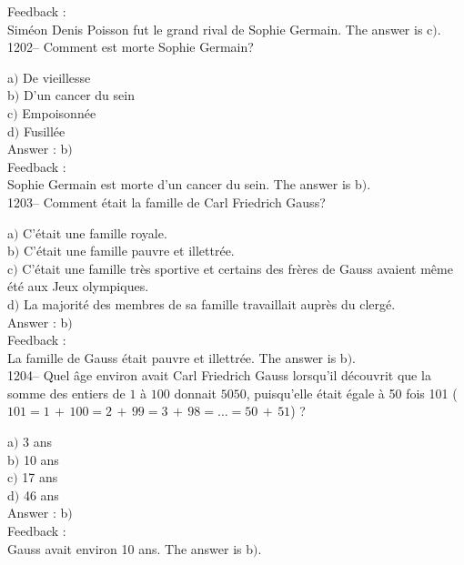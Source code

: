 ﻿\documentclass[letterpaper, 12pt]{article}
\begin{document}
Feedback : \\
Sim\'eon Denis Poisson fut le grand rival de Sophie Germain.
The answer is c$)$.\\

1202-- Comment est morte Sophie Germain?

a$)$ De vieillesse \\
b$)$ D'un cancer du sein \\
c$)$ Empoisonn\'ee \\
d$)$ Fusill\'ee\\

Answer : b$)$\\

Feedback : \\
Sophie Germain est morte d'un cancer du sein.
The answer is b$)$.\\

1203-- Comment \'etait la famille de Carl Friedrich Gauss?

a$)$ C'\'etait une famille royale. \\
b$)$ C'\'etait une famille pauvre et illettr\'ee. \\
c$)$ C'\'etait une famille tr\`es sportive et certains des fr\`eres de Gauss
avaient m\^eme \'et\'e aux Jeux olympiques. \\
d$)$ La majorit\'e des membres de sa famille travaillait aupr\`es du
clerg\'e.\\

Answer : b$)$\\

Feedback : \\
La famille de Gauss \'etait pauvre et illettr\'ee.
The answer is b$)$.\\

1204-- Quel \^age environ avait Carl Friedrich Gauss lorsqu'il
d\'ecouvrit que la somme des entiers de $1$ \`a $100$ donnait
$5050$, puisqu'elle \'etait \'egale \`a 50 fois 101
($101=1\,+\,100=2\,+\,99=3\,+\,98=\ldots=50\,+\,51$) ?

a$)$ 3 ans \\
b$)$ 10 ans \\
c$)$ 17 ans \\
d$)$ 46 ans\\

Answer : b$)$\\

Feedback : \\
Gauss avait environ 10 ans.
The answer is b$)$.\\
\end{document}
